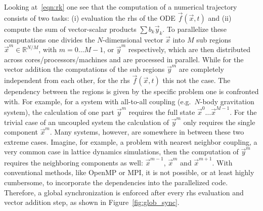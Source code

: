 \documentclass[a4wide,10pt]{scrartcl}
\begin{document}
Looking at~\eqref{eqn:rk} one see that the computation of a numerical trajectory consists of two tasks: (i) evaluation the rhs of the ODE $\vec f(\vec x,t)$ and (ii) compute the sum of vector-scalar products $\sum b_k \vec y_k$.
To parallelize these computations one divides the $N$-dimensional vector $\vec x$ into $M$ sub regions $\vec x^{m}\in \mathbb{R}^{N/M}$, with $m=0\dots M-1$, or $\vec y^{m}$ respectively, which are then distributed across cores/processors/machines and are processed in parallel.
While for the vector addition the computations of the sub regions $\vec y^m$ are completely independent from each other, for the rhs $\vec f(\vec x , t)$ this not the case.
The dependency between the regions is given by the specific problem one is confronted with.
For example, for a system with all-to-all coupling (e.g.\ $N$-body gravitation system), the calculation of one part $\vec y^m$ requires the full state $\vec x^{0}\dots \vec x^{M-1}$.
For the trivial case of an uncoupled system the calculation of $\vec y^m$ only requires the single component $\vec x^m$.
Many systems, however, are somewhere in between these two extreme cases.
Imagine, for example, a problem with nearest neighbor coupling, a very common case in lattice dynamics simulations, then the computation of $\vec y^m$ requires the neighboring components as well: $\vec x^{m-1}$, $\vec x^{m}$ and $\vec x^{m+1}$.
With conventional methods, like OpenMP or MPI, it is not possible, or at least highly cumbersome, to incorporate the dependencies into the parallelized code.
Therefore, a global synchronization is enforced after every rhs evaluation and vector addition step, as shown in Figure~\ref{fig:glob_sync}.
\end{document}
